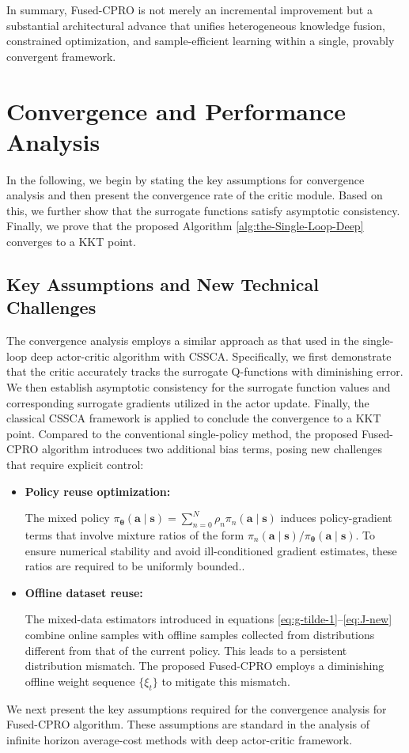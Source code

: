 \documentclass{IEEEtran}
\begin{document}
In summary, Fused-CPRO is not merely an incremental improvement but a substantial architectural advance that unifies heterogeneous knowledge fusion, constrained optimization, and sample-efficient learning within a single, provably convergent framework.

\section{Convergence and Performance Analysis}
\label{sec:CONVERGENCE-ANALYSIS}
In the following, we begin by stating the key assumptions for convergence analysis and then present the convergence rate of the critic module. Based on this, we further show that the surrogate functions satisfy asymptotic consistency. Finally, we prove that the proposed Algorithm \ref{alg:the-Single-Loop-Deep} converges to a KKT point.

\subsection{Key Assumptions and New Technical Challenges}
The convergence analysis employs a similar approach as that used in the single-loop deep actor-critic algorithm with CSSCA. Specifically, we first demonstrate that the critic accurately tracks the surrogate Q-functions with diminishing error. We then establish asymptotic consistency for the surrogate function values and corresponding surrogate gradients utilized in the actor update. Finally, the classical CSSCA framework is applied to conclude the convergence to a KKT point. Compared to the conventional single-policy method, the proposed Fused-CPRO algorithm introduces two additional bias terms, posing new challenges that require explicit control:

\begin{itemize}
\item \textbf{Policy reuse optimization:}

The mixed policy $\pi_{\boldsymbol{\theta}}(\boldsymbol{a}\mid\boldsymbol{s})=\sum_{n=0}^{N}\rho_{n}\pi_{n}(\boldsymbol{a}\mid\boldsymbol{s})$ induces policy-gradient terms that involve mixture ratios of the form $\pi_{n}(\boldsymbol{a}\mid\boldsymbol{s})/\pi_{\boldsymbol{\theta}}(\boldsymbol{a}\mid\boldsymbol{s})$. To ensure numerical stability and avoid ill-conditioned gradient estimates, these ratios are required to be uniformly bounded..
\item \textbf{Offline dataset reuse:}

The mixed-data estimators introduced in equations \eqref{eq:g-tilde-1}--\eqref{eq:J-new} combine online samples with offline samples collected from distributions different from that of the current policy. This leads to a persistent distribution mismatch. The proposed Fused-CPRO employs a diminishing offline weight sequence $\{\xi_{t}\}$ to mitigate this mismatch.
\end{itemize}
We next present the key assumptions required for the convergence analysis for Fused-CPRO algorithm. These assumptions are standard in the analysis of infinite horizon average-cost methods with deep actor-critic framework.
\end{document}
